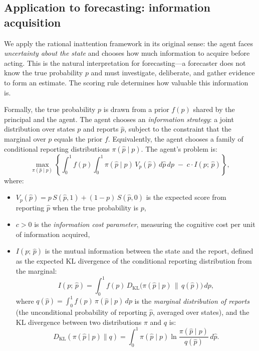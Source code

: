 \documentclass[11pt]{article}
\begin{document}
\subsection{Application to forecasting: information acquisition}

We apply the rational inattention framework in its original sense: the agent faces \emph{uncertainty about the state} and chooses how much information to acquire before acting. This is the natural interpretation for forecasting---a forecaster does not know the true probability $p$ and must investigate, deliberate, and gather evidence to form an estimate. The scoring rule determines how valuable this information is.

Formally, the true probability $p$ is drawn from a prior $f(p)$ shared by the principal and the agent. The agent chooses an \emph{information strategy}: a joint distribution over states $p$ and reports $\hat{p}$, subject to the constraint that the marginal over $p$ equals the prior $f$. Equivalently, the agent chooses a family of conditional reporting distributions $\pi(\hat{p} \mid p)$. The agent's problem is:
\begin{equation}\label{eq:ri-problem}
\max_{\pi(\hat{p} \mid p)} \left\{ \int_0^1 f(p) \int_0^1 \pi(\hat{p} \mid p)\, V_p(\hat{p}) \, d\hat{p}\, dp \;-\; c \cdot I(p;\, \hat{p}) \right\},
\end{equation}
where:
\begin{itemize}
\item $V_p(\hat{p}) = p\,S(\hat{p},1) + (1-p)\,S(\hat{p},0)$ is the expected score from reporting $\hat{p}$ when the true probability is $p$,
\item $c > 0$ is the \emph{information cost parameter}, measuring the cognitive cost per unit of information acquired,
\item $I(p;\,\hat{p})$ is the mutual information between the state and the report, defined as the expected KL divergence of the conditional reporting distribution from the marginal:
\[
I(p;\,\hat{p}) = \int_0^1 f(p)\, D_{\mathrm{KL}}\!\big(\pi(\hat{p} \mid p) \,\big\|\, q(\hat{p})\big)\, dp,
\]
where $q(\hat{p}) = \int_0^1 f(p)\,\pi(\hat{p} \mid p)\,dp$ is the \emph{marginal distribution of reports} (the unconditional probability of reporting $\hat{p}$, averaged over states), and the KL divergence between two distributions $\pi$ and $q$ is:
\[
D_{\mathrm{KL}}(\pi(\hat{p} \mid p) \| q) = \int_0^1 \pi(\hat{p} \mid p) \ln \frac{\pi(\hat{p} \mid p)}{q(\hat{p})} \, d\hat{p}.
\]
\end{itemize}
\end{document}
